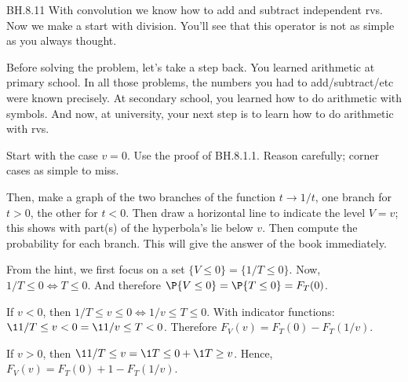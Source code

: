 
\setcounter{theorem}{10}
\begin{exercise} BH.8.11
With convolution we know how to  add and subtract independent rvs. Now we make a start with division. You'll see that this operator is not as simple as you always thought.

Before solving the problem, let's take a step back.
You learned arithmetic at primary school.
In all those problems, the numbers you had to add/subtract/etc were known precisely.
At secondary school, you learned how to do arithmetic with symbols.
And now, at university, your next step is to learn how to do arithmetic with rvs.



\begin{hint}
Start with the case $v=0$. Use the proof of BH.8.1.1. Reason carefully; corner cases as simple to miss.

Then, make a graph of the two branches of the function  $t \to 1/t$, one branch for $t>0$, the other for $t<0$.
Then draw a horizontal line to indicate the level $V=v$; this shows with part(s) of the hyperbola's lie below $v$.
Then compute the probability for each branch. This will give the answer of the  book immediately.
\end{hint}
\begin{solution}
From the hint, we first focus on a set $\{V\leq 0\} = \{1/T \leq 0\}$. Now,  $1/T\leq 0 \iff T\leq 0$. And therefore $\P{V\leq 0} = \P{T\leq 0} = F_T(0)$.

If $v<0$, then $1/T \leq v \leq 0\iff 1/v \leq T \leq 0$.
With indicator functions: $\1{1/T \leq v < 0} = \1{1/v \leq T < 0}$.
Therefore $F_V(v) = F_T(0) - F_T(1/v)$.

If $v>0$, then $\1{1/T \leq v} = \1{T\leq 0} + \1{T\geq v}$. Hence,
$F_V(v) = F_T(0) + 1- F_T(1/v)$.
\end{solution}
\end{exercise}

